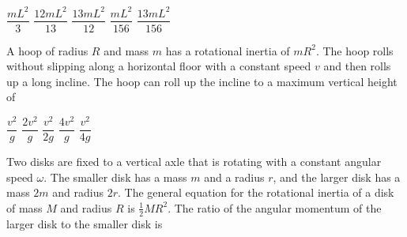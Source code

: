 \documentclass{../../../oss-ap12ibhl}
\begin{document}
\begin{questions}
  \begin{minipage}{.4\linewidth}
  \end{minipage}
  \begin{minipage}{.2\linewidth}
    \begin{choices}
      \choice$\dfrac{mL^2}{3}$
      \choice$\dfrac{12mL^2}{13}$
      \choice$\dfrac{13mL^2}{12}$
      \choice$\dfrac{mL^2}{156}$
      \choice$\dfrac{13mL^2}{156}$
    \end{choices}
  \end{minipage}

  \question A hoop of radius $R$ and mass $m$ has a rotational inertia of
  $mR^2$. The hoop rolls without slipping along a horizontal floor with a
  constant speed $v$ and then rolls up a long incline. The hoop can roll up the
  incline to a maximum vertical height of

  \begin{minipage}{.5\linewidth}
  \end{minipage}
  \begin{minipage}{.2\linewidth}
    \begin{choices}
      \choice$\dfrac{v^2}{g}$
      \choice$\dfrac{2v^2}{g}$
      \choice$\dfrac{v^2}{2g}$
      \choice$\dfrac{4v^2}{g}$
      \choice$\dfrac{v^2}{4g}$
    \end{choices}
  \end{minipage}
    
  \question Two disks are fixed to a vertical axle that is rotating with a
  constant angular speed $\omega$. The smaller disk has a mass $m$ and a radius
  $r$, and the larger disk has a mass $2m$ and radius $2r$. The general equation
  for the rotational inertia of a disk of mass $M$ and radius $R$ is
  $\frac12MR^2$. The ratio of the angular momentum of the larger disk to
  the smaller disk is


\end{questions}
\end{document}
